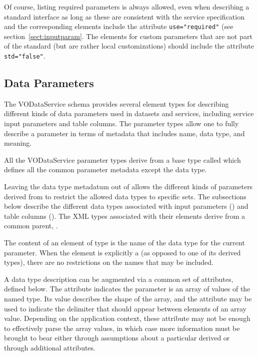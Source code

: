 \documentclass[11pt,a4paper]{ivoa}
\begin{document}
Of course, listing required parameters is always allowed, even when
describing a standard interface as long as these are consistent with
the service specification and the corresponding 
elements include the attribute \verb|use="required"| (see
section~\ref{sect:inputparam}.  The 
elements for custom parameters that are not part of the standard (but
are rather local customizations) should include the attribute
\verb|std="false"|.





\subsection{Data Parameters}
\label{sect:param}


The VODataService schema provides several element types for describing
different kinds of data parameters used in datasets and services,
including service input parameters and table columns.  The parameter
types allow one to fully describe a parameter in terms of metadata
that includes name, data type, and meaning.  


All the VODataService parameter types derive from a base type called
 which defines all the common parameter
metadata except the data type.  



Leaving the data type metadatum out of 
allows the different kinds of parameters derived from
 to restrict the allowed data types to
specific sets.  The subsections below describe the different data
types associated with input parameters
() and table
columns ().  The
XML types associated with their  elements
derive from a common parent, .



The content of an element of type  is the name
of the data type for the current parameter.  When the element is explicitly
a  (as opposed to one of its derived types),
there are no restrictions on the names that may be included.  



A data type description can be augmented via a common set of
 attributes, defined below.  The
 attribute indicates the parameter is an array
of values of the named type.  Its value describes the shape of the
array, and the  attribute may be used to indicate
the delimiter that should appear between elements of an array value.
Depending on the application context, these attribute may not be
enough to effectively parse the array values, in which case more
information must be brought to bear either through assumptions about
a particular derived  or through additional
attributes.  
\end{document}
